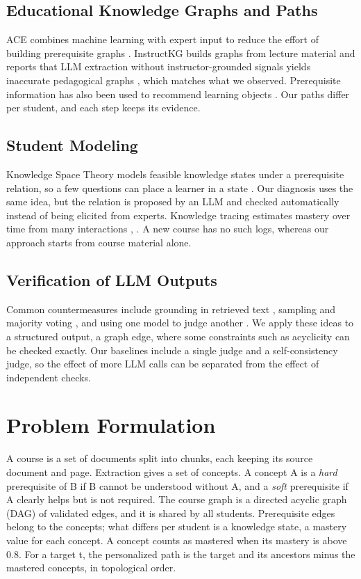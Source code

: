 \documentclass[conference]{IEEEtran}
\begin{document}
\subsection{Educational Knowledge Graphs and Paths}
ACE combines machine learning with expert input to reduce the effort of building prerequisite graphs \cite{ace}. InstructKG builds graphs from lecture material and reports that LLM extraction without instructor-grounded signals yields inaccurate pedagogical graphs \cite{instructkg}, which matches what we observed. Prerequisite information has also been used to recommend learning objects \cite{chanaa}. Our paths differ per student, and each step keeps its evidence.

\subsection{Student Modeling}
Knowledge Space Theory models feasible knowledge states under a prerequisite relation, so a few questions can place a learner in a state \cite{kst}. Our diagnosis uses the same idea, but the relation is proposed by an LLM and checked automatically instead of being elicited from experts. Knowledge tracing estimates mastery over time from many interactions \cite{bkt}, \cite{dkt}. A new course has no such logs, whereas our approach starts from course material alone.

\subsection{Verification of LLM Outputs}
Common countermeasures include grounding in retrieved text \cite{rag}, sampling and majority voting \cite{selfcons}, and using one model to judge another \cite{judge}. We apply these ideas to a structured output, a graph edge, where some constraints such as acyclicity can be checked exactly. Our baselines include a single judge and a self-consistency judge, so the effect of more LLM calls can be separated from the effect of independent checks.

\section{Problem Formulation}
A course is a set of documents split into chunks, each keeping its source document and page. Extraction gives a set of concepts. A concept A is a \emph{hard} prerequisite of B if B cannot be understood without A, and a \emph{soft} prerequisite if A clearly helps but is not required. The course graph is a directed acyclic graph (DAG) of validated edges, and it is shared by all students. Prerequisite edges belong to the concepts; what differs per student is a knowledge state, a mastery value for each concept. A concept counts as mastered when its mastery is above 0.8. For a target t, the personalized path is the target and its ancestors minus the mastered concepts, in topological order.
\end{document}
